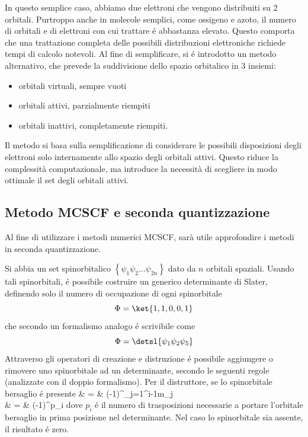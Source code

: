 In questo semplice caso, abbiamo due elettroni che vengono distribuiti
su 2 orbitali. Purtroppo anche in molecole semplici, come ossigeno e
azoto, il numero di orbitali e di elettroni con cui trattare \'e abbastanza 
elevato. Questo comporta che una trattazione completa delle possibili 
distribuzioni elettroniche richiede tempi di calcolo notevoli. Al fine 
di semplificare, si \'e introdotto un metodo alternativo, che prevede la 
suddivisione dello spazio orbitalico in 3 insiemi: 
\begin{itemize}
\item orbitali virtuali, sempre vuoti
\item orbitali attivi, parzialmente riempiti
\item orbitali inattivi, completamente riempiti.
\end{itemize}

Il metodo si basa sulla semplificazione di considerare le possibili
disposizioni degli elettroni solo internamente allo spazio degli
orbitali attivi. Questo riduce la complessit\`a computazionale, ma
introduce la necessit\`a di scegliere in modo ottimale il set degli 
orbitali attivi.

\subsection{Metodo MCSCF e seconda quantizzazione}

Al fine di utilizzare i metodi numerici MCSCF, sar\`a utile approfondire
i metodi in seconda quantizzazione.

Si abbia un set spinorbitalico $ \left\{ \psi_1 \psi_2
\ldots \psi_{2n} \right\} $ dato da $n$ orbitali spaziali. Usando
tali spinorbitali, \'e possibile costruire un generico determinante di
Slater, definendo solo il numero di occupazione di ogni spinorbitale
$$
\Phi = \ket{1,1,0,0,1}
$$
che secondo un formalismo analogo \'e scrivibile come
$$
\Phi = \detsl{\psi_1 \psi_2 \psi_5}
$$
Attraverso gli operatori di creazione e distruzione \'e possibile
aggiungere o rimovere uno spinorbitale ad un determinante, secondo le
seguenti regole (analizzate con il doppio formalismo). Per il distruttore, 
se lo spinorbitale bersaglio \'e presente
\beqas
{}  & = &
(-1)^{\sum_{j=1}^{i-1}m_j}  \\
 & = &
(-1)^{p_i} 
\eeqas
dove $p_i$ \'e il numero di trasposizioni necessarie a portare l'orbitale
bersaglio in prima posizione nel determinante.
Nel caso lo spinorbitale sia assente, il risultato \'e zero.

